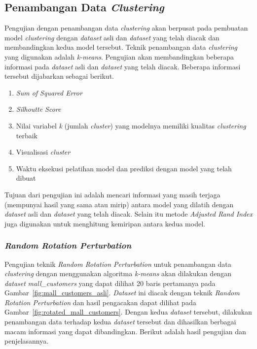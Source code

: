 \subsection{Penambangan Data \textit{Clustering}}
\label{subsec:pengujian-clustering}

Pengujian dengan penambangan data \textit{clustering} akan berpusat pada pembuatan model \textit{clustering} dengan \textit{dataset} asli dan \textit{dataset} yang telah diacak dan membandingkan kedua model tersebut. Teknik penambangan data \textit{clustering} yang digunakan adalah \textit{k-means}. Pengujian akan membandingkan beberapa informasi pada \textit{dataset} asli dan \textit{dataset} yang telah diacak. Beberapa informasi tersebut dijabarkan sebagai berikut.
\begin{enumerate}
	\item \textit{Sum of Squared Error}
	\item \textit{Silhoutte Score}
	\item Nilai variabel \textit{k} (jumlah \textit{cluster}) yang modelnya memiliki kualitas \textit{clustering} terbaik
	\item Visualisasi \textit{cluster}
	\item Waktu eksekusi pelatihan model dan prediksi dengan model yang telah dibuat
\end{enumerate}
Tujuan dari pengujian ini adalah mencari informasi yang masih terjaga (mempunyai hasil yang sama atau mirip) antara model yang dilatih dengan \textit{dataset} asli dan \textit{dataset} yang telah diacak. Selain itu metode \textit{Adjusted Rand Index} juga digunakan untuk menghitung kemiripan antara kedua model.

\subsubsection{\textit{Random Rotation Perturbation}}
\label{subsubsec:pengujian-clustering-rrp}

Pengujian teknik \textit{Random Rotation Perturbation} untuk penambangan data \textit{clustering} dengan menggunakan algoritma \textit{k-means} akan dilakukan dengan \textit{dataset} \textit{mall\_customers} yang dapat dilihat 20 baris pertamanya pada Gambar~\ref{fig:mall_customers_asli}. \textit{Dataset} ini diacak dengan teknik \textit{Random Rotation Perturbation} dan hasil pengacakan dapat dilihat pada Gambar~\ref{fig:rotated_mall_customers}. Dengan kedua \textit{dataset} tersebut, dilakukan penambangan data terhadap kedua \textit{dataset} tersebut dan dihasilkan berbagai macam informasi yang dapat dibandingkan. Berikut adalah hasil pengujian dan penjelasannya.

